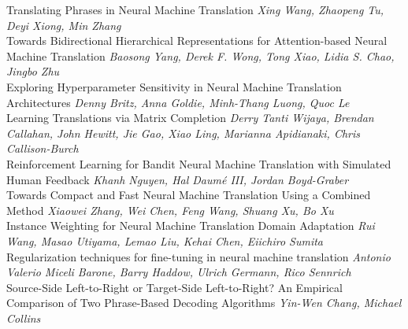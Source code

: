 \documentclass{book}
\begin{document}
    \noindent	Translating Phrases in Neural Machine Translation \newline 
    {\itshape Xing Wang, Zhaopeng Tu, Deyi Xiong, Min Zhang} \\
    
    \noindent	Towards Bidirectional Hierarchical Representations for Attention-based Neural Machine Translation \newline 
    {\itshape Baosong Yang, Derek F. Wong, Tong Xiao, Lidia S. Chao, Jingbo Zhu} \\
    
    \noindent	Exploring Hyperparameter Sensitivity in Neural Machine Translation Architectures \newline 
    {\itshape Denny Britz, Anna Goldie, Minh-Thang Luong, Quoc Le} \\
    
    \noindent	Learning Translations via Matrix Completion \newline 
    {\itshape Derry Tanti Wijaya, Brendan Callahan, John Hewitt, Jie Gao, Xiao Ling, Marianna Apidianaki, Chris Callison-Burch} \\
    
    \noindent	Reinforcement Learning for Bandit Neural Machine Translation with Simulated Human Feedback \newline 
    {\itshape Khanh Nguyen, Hal Daumé III, Jordan Boyd-Graber} \\
    
    \noindent	Towards Compact and Fast Neural Machine Translation Using a Combined Method \newline 
    {\itshape Xiaowei Zhang, Wei Chen, Feng Wang, Shuang Xu, Bo Xu} \\
    
    \noindent	Instance Weighting for Neural Machine Translation Domain Adaptation \newline 
    {\itshape Rui Wang, Masao Utiyama, Lemao Liu, Kehai Chen, Eiichiro Sumita} \\
    
    \noindent	Regularization techniques for fine-tuning in neural machine translation \newline 
    {\itshape Antonio Valerio Miceli Barone, Barry Haddow, Ulrich Germann, Rico Sennrich} \\
    
    \noindent	Source-Side Left-to-Right or Target-Side Left-to-Right? An Empirical Comparison of Two Phrase-Based Decoding Algorithms \newline 
    {\itshape Yin-Wen Chang, Michael Collins} \\
    
\end{document}
